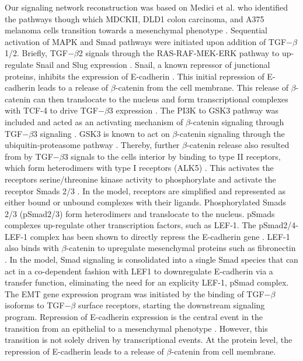 \documentclass[11pt,letterpaper]{article}
\begin{document}
Our signaling network reconstruction was based on Medici et al. who identified the pathways though which MDCKII, DLD1 colon carcinoma,
and A375 melanoma cells transition towards a mesenchymal phenotype \cite{Medici:2008fk}.
Sequential activation of MAPK and Smad pathways were initiated upon addition of TGF$-\beta$1/2.
Briefly, TGF$-\beta$2 signals through the RAS-RAF-MEK-ERK pathway to up-regulate Snail and Slug expression \cite{Medici:2006qa}.
Snail, a known repressor of junctional proteins, inhibits the expression of E-cadherin \cite{Cano:2000kh}.
This initial repression of E-cadherin leads to a release of $\beta$-catenin from the cell membrane.
This release of $\beta$-catenin can then translocate to the nucleus and form transcriptional complexes with TCF-4 to drive TGF$-\beta$3 expression \cite{Medici:2008fk}.
The PI3K to GSK3 pathway was included and acted as an activating mechanism of $\beta$-catenin signaling through TGF$-\beta$3 signaling \cite{Medici:2008fk}.
GSK3 is known to act on $\beta$-catenin signaling through the ubiquitin-proteasome pathway \cite{Zhou:2004kx,Larue:2005vn}.
Thereby, further $\beta$-catenin release also resulted from by TGF$-\beta$3 signals to the cells interior by binding to type II receptors, which form heterodimers with type I receptors (ALK5) \cite{Derynck:2003fc}.
This activates the receptors serine/threonine kinase activity to phosphorylate and activate the receptor Smads 2/3 \cite{Massague:2005qc}.
In the model, receptors are simplified and represented as either bound or unbound complexes with their ligands.
Phosphorylated Smads 2/3 (pSmad2/3) form heterodimers and translocate to the nucleus. pSmads complexes up-regulate other transcription factors, such as LEF-1.
The pSmad2/4-LEF-1 complex has been shown to directly repress the E-cadherin gene \cite{Nawshad:2007kl}.
LEF-1 also binds with $\beta$-catenin to upregulate mesenchymal proteins such as fibronectin \cite{Medici2011}.
In the model, Smad signaling is consolidated into a single Smad species that can act in a co-dependent fashion with LEF1 to downregulate E-cadherin via a transfer function, eliminating the need for an explicity LEF-1, pSmad complex.
The EMT gene expression program was initiated by the binding of TGF$-\beta$ isoforms to TGF$-\beta$ surface receptors, starting the downstream signaling program.
Repression of E-cadherin expression is the central event in the transition from an epithelial to a mesenchymal phenotype \cite{Cano:2000kh}.
However, this transition is not solely driven by transcriptional events.
At the protein level, the repression of E-cadherin leads to a release of $\beta$-catenin from cell membrane.
\end{document}
